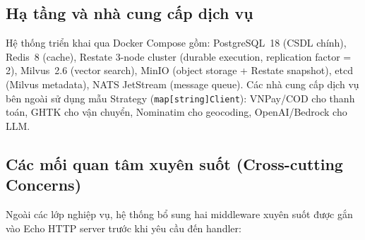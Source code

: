 \begin{center}
{
}%
\label{fig:architecture}
\end{center}

\subsection{Hạ tầng và nhà cung cấp dịch vụ}
\label{subsec:infra}

Hệ thống triển khai qua Docker Compose gồm: PostgreSQL~18 (CSDL chính), Redis~8 (cache), Restate 3-node cluster (durable execution, replication factor = 2), Milvus~2.6 (vector search), MinIO (object storage + Restate snapshot), etcd (Milvus metadata), NATS JetStream (message queue). Các nhà cung cấp dịch vụ bên ngoài sử dụng mẫu Strategy (\texttt{map[string]Client}): VNPay/COD cho thanh toán, GHTK cho vận chuyển, Nominatim cho geocoding, OpenAI/Bedrock cho LLM.

\subsection{Các mối quan tâm xuyên suốt (Cross-cutting Concerns)}
\label{subsec:crosscutting}

Ngoài các lớp nghiệp vụ, hệ thống bổ sung hai middleware xuyên suốt được gắn vào Echo HTTP server trước khi yêu cầu đến handler:

